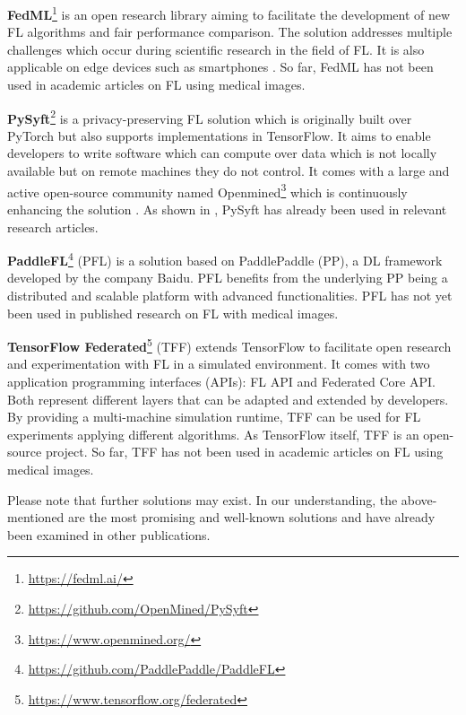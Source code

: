 \textbf{FedML}\footnote{\url{https://fedml.ai/}}
is an open research library aiming to facilitate the development of new FL algorithms and fair performance comparison. The solution addresses multiple challenges which occur during scientific research in the field of FL. It is also applicable on edge devices such as smartphones \citep{He2020FedML:Learning}.
So far, FedML has not been used in academic articles on FL using medical images.

\textbf{PySyft}\footnote{\url{https://github.com/OpenMined/PySyft}}
is a privacy-preserving FL solution which is originally built over PyTorch but also supports implementations in TensorFlow. It aims to enable developers to write software which can compute over data which is not locally available but on remote machines they do not control. It comes with a large and active open-source community named Openmined\footnote{\url{https://www.openmined.org/}} which is continuously enhancing the solution \citep{Ryffel2018ALearning}. As shown in , PySyft has already been used in relevant research articles.

\textbf{PaddleFL}\footnote{\url{https://github.com/PaddlePaddle/PaddleFL}}
(PFL) is a solution based on PaddlePaddle (PP), a DL framework developed by the company Baidu. PFL benefits from the underlying PP being a distributed and scalable platform with advanced functionalities.
PFL has not yet been used in published research on FL with medical images.

\textbf{TensorFlow Federated}\footnote{\url{https://www.tensorflow.org/federated}}
(TFF) extends TensorFlow to facilitate open research and experimentation with FL in a simulated environment. It comes with two application programming interfaces (APIs): FL API and Federated Core API. Both represent different layers that can be adapted and extended by developers. By providing a multi-machine simulation runtime, TFF can be used for FL experiments applying different algorithms. As TensorFlow itself, TFF is an open-source project. So far, TFF has not been used in academic articles on FL using medical images.

Please note that further solutions may exist. In our understanding, the above-mentioned are the most promising and well-known solutions and have already been examined in other publications\citep{Li2019AProtection, He2020FedML:Learning}.



